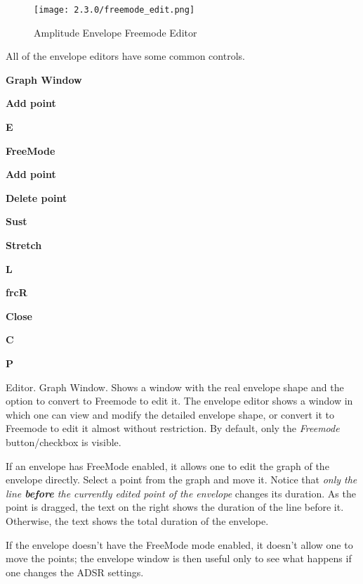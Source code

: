 \begin{figure}[H]
   \centering
   \texttt{[image: 2.3.0/freemode\_edit.png]}
   \caption{Amplitude Envelope Freemode Editor}
   \label{fig:amplitude_envelope_freemode}
\end{figure}

   All of the envelope editors have some common controls.

   \begin{enumber}
      \item \textbf{Graph Window}
      \item \textbf{Add point}
      \item \textbf{E}
      \item \textbf{FreeMode}
      \item \textbf{Add point}
      \item \textbf{Delete point}
      \item \textbf{Sust}
      \item \textbf{Stretch}
      \item \textbf{L}
      \item \textbf{frcR}
      \item \textbf{Close}
      \item \textbf{C}
      \item \textbf{P}
   \end{enumber}

   \setcounter{ItemCounter}{0}      %

   Editor.  Graph Window.
   Shows a window with the real envelope shape and the option to convert to
   Freemode to edit it.
   The envelope editor shows a window in which one can view and modify the
   detailed envelope shape, or convert it to Freemode to edit it almost
   without restriction.
   By default, only the \textsl{Freemode} button/checkbox is visible.

   If an envelope has FreeMode enabled, it allows one to edit the
   graph of the envelope directly. Select a point from the graph and move it.
   Notice that
   \textsl{only the line \textbf{before} the currently edited point of the
   envelope} changes its duration.
   As the point is dragged, the text on the right shows the duration of
   the line before it. Otherwise, the text shows the total duration of the
   envelope.

   If the envelope doesn't have the FreeMode mode enabled, it doesn't allow
   one to move the points; the envelope window is then useful only to see
   what happens if one changes the ADSR settings.

